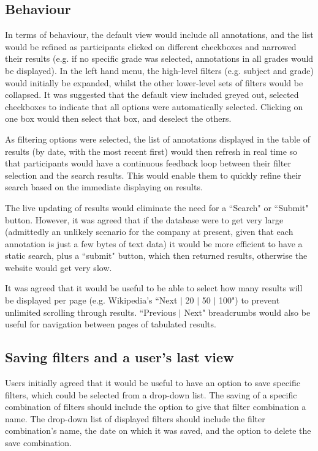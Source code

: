 \subsection{Behaviour}
In terms of behaviour,  the default view would include all annotations, and the list would be refined as participants clicked on different checkboxes and narrowed their results (e.g. if no specific grade was selected, annotations in all grades would be displayed). In the left hand menu, the high-level filters (e.g. subject and grade) would initially be expanded, whilst the other lower-level sets of filters would be collapsed. It was suggested that the default view included greyed out, selected checkboxes to indicate that all options were automatically selected. Clicking on one box would then select that box, and deselect the others. 

As filtering options were selected, the list of annotations displayed in the table of results (by date, with the most recent first) would then refresh in real time so that participants would have a continuous feedback loop between their filter selection and the search results. This would enable them to quickly refine their search based on the immediate displaying on results.

The live updating of results would eliminate the need for a ``Search" or ``Submit" button. However, it was agreed that if the database were to get very large (admittedly an unlikely scenario for the company at present, given that each annotation is just a few bytes of text data) it would be more efficient to have a static search, plus a ``submit" button, which then returned results, otherwise the website would get very slow. 

It was agreed that it would be useful to be able to select how many results will be displayed per page (e.g. Wikipedia's ``Next $\vert$ 20 $\vert$ 50 $\vert$ 100") to prevent unlimited scrolling through results. ``Previous $\vert$ Next" breadcrumbs would also be useful for navigation between pages of tabulated results. 

\subsection{Saving filters and a user's last view}
Users initially agreed that it would be useful to have an option to save specific filters, which could be selected from a drop-down list. The saving of a specific combination of filters should include the option to give that filter combination a name. The drop-down list of displayed filters should include the filter combination's name, the date on which it was saved, and the option to delete the save combination.

